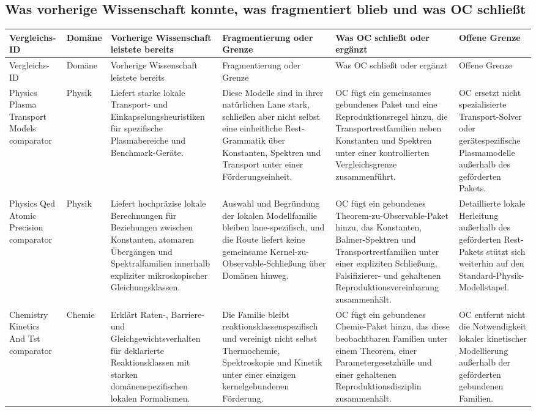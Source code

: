 \subsection{Was vorherige Wissenschaft konnte, was fragmentiert blieb und was OC schließt}
\begingroup
\scriptsize
\setlength{\emergencystretch}{1.5em}
\setlength{\tabcolsep}{2pt}
\setlength{\LTleft}{0pt}
\setlength{\LTright}{0pt}
\begin{longtable}{@{}L{0.17\textwidth}L{0.09\textwidth}L{0.17\textwidth}L{0.17\textwidth}L{0.20\textwidth}L{0.14\textwidth}@{}}
\toprule
Vergleichs-ID & Domäne & Vorherige Wissenschaft leistete bereits & Fragmentierung oder Grenze & Was OC schließt oder ergänzt & Offene Grenze \\
\midrule
\endfirsthead
\toprule
Vergleichs-ID & Domäne & Vorherige Wissenschaft leistete bereits & Fragmentierung oder Grenze & Was OC schließt oder ergänzt & Offene Grenze \\
\midrule
\endhead
Physics Plasma Transport Models comparator & Physik & Liefert starke lokale Transport- und Einkapselungsheuristiken für spezifische Plasmabereiche und Benchmark-Geräte. & Diese Modelle sind in ihrer natürlichen Lane stark, schließen aber nicht selbst eine einheitliche Rest-Grammatik über Konstanten, Spektren und Transport unter einer Förderungseinheit. & OC fügt ein gemeinsames gebundenes Paket und eine Reproduktionsregel hinzu, die Transportrestfamilien neben Konstanten und Spektren unter einer kontrollierten Vergleichsgrenze zusammenführt. & OC ersetzt nicht spezialisierte Transport-Solver oder gerätespezifische Plasmamodelle außerhalb des geförderten Pakets. \\
Physics Qed Atomic Precision comparator & Physik & Liefert hochpräzise lokale Berechnungen für Beziehungen zwischen Konstanten, atomaren Übergängen und Spektralfamilien innerhalb expliziter mikroskopischer Gleichungsklassen. & Auswahl und Begründung der lokalen Modellfamilie bleiben lane-spezifisch, und die Route liefert keine gemeinsame Kernel-zu-Observable-Schließung über Domänen hinweg. & OC fügt ein gebundenes Theorem-zu-Observable-Paket hinzu, das Konstanten, Balmer-Spektren und Transportrestfamilien unter einer expliziten Schließung, Falsifizierer- und gehaltenen Reproduktionsvereinbarung zusammenhält. & Detaillierte lokale Herleitung außerhalb des geförderten Rest-Pakets stützt sich weiterhin auf den Standard-Physik-Modellstapel. \\
Chemistry Kinetics And Tst comparator & Chemie & Erklärt Raten-, Barriere- und Gleichgewichtsverhalten für deklarierte Reaktionsklassen mit starken domänenspezifischen lokalen Formalismen. & Die Familie bleibt reaktionsklassenspezifisch und vereinigt nicht selbst Thermochemie, Spektroskopie und Kinetik unter einer einzigen kernelgebundenen Förderung. & OC fügt ein gebundenes Chemie-Paket hinzu, das diese beobachtbaren Familien unter einem Theorem, einer Parametergesetzhülle und einer gehaltenen Reproduktionsdisziplin zusammenhält. & OC entfernt nicht die Notwendigkeit lokaler kinetischer Modellierung außerhalb der geförderten gebundenen Familien. \\

\end{longtable}
